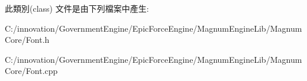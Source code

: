 此類別(class) 文件是由下列檔案中產生\+:\begin{DoxyCompactItemize}
\item 
C\+:/innovation/\+Government\+Engine/\+Epic\+Force\+Engine/\+Magnum\+Engine\+Lib/\+Magnum\+Core/Font.\+h\item 
C\+:/innovation/\+Government\+Engine/\+Epic\+Force\+Engine/\+Magnum\+Engine\+Lib/\+Magnum\+Core/Font.\+cpp\end{DoxyCompactItemize}
